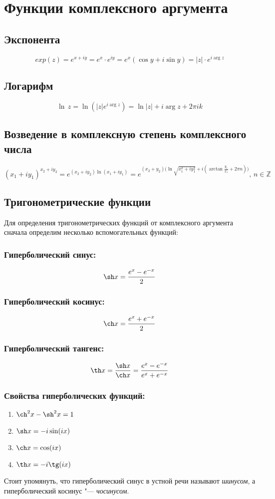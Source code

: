 \documentclass{article}
\newcommand{\Z}{\mathbb Z}
\begin{document}
\newpage
\section{Функции комплексного аргумента}
\subsection{Экспонента}
$$ exp(z)=e^{x+iy}=e^x\cdot e^{iy}=e^x(\cos y+i\sin y) = |z| \cdot e^{i \arg z} $$

\subsection{Логарифм}
$$ \ln\,z=\ln(|z|e^{i \arg z})=\ln|z|+i\arg z+2\pi i k $$

\subsection{Возведение в комплексную степень комплексного числа}
$$ (x_1+iy_1)^{x_2+iy_2}=e^{(x_2+iy_2)\ln(x_1+iy_1)}=e^{(x_2+y_2)\big(\ln\sqrt{x_1^2+i y_1^2}+i(\arctan\frac{y_1}{x_1}+2\pi n)\big)},\,n\in\Z$$

\subsection{Тригонометрические функции}
Для определения тригонометрических функций от комплексного аргумента сначала определим несколько вспомогательных функций:

\subsubsection{Гиперболический синус:}
	$$\sh x = \frac{e^x - e^{-x}}{2}$$
	
\subsubsection{Гиперболический косинус:}
	$$\ch x = \frac{{e^x} + e^{-x}}{2}$$

\subsubsection{Гиперболический тангенс:}
	$$\th x = \frac{\sh x}{\ch x} = \frac{e^x - e^{-x}}{e^x + e^{-x}}$$
	
\subsubsection{Свойства гиперболических функций:}
	\begin{enumerate}
		\item $\ch^2x - \sh^2x = 1$
		\item $\sh x = -i\sin(ix)$
		\item $\ch x = \cos(ix)$
		\item $\th x = -i\tg(ix)$
	\end{enumerate}
Стоит упомянуть, что гиперболический синус в устной речи называют \textit{шинусом}, а гиперболический косинус "--- \textit{чосинусом}.
\end{document}
